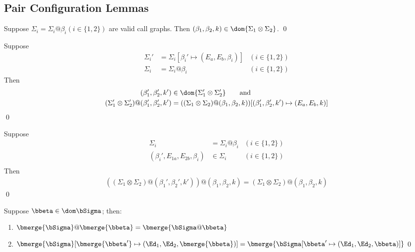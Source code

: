 \subsection{Pair Configuration Lemmas}
\label{sec:pair-lemmas}




\begin{lemma}
  Suppose $\Sigma_i = \Sigma_i@\beta_i (i\in\{1,2\})$ are valid call graphs.
  Then $(\beta_1,\beta_2,k)    \in \dom{\Sigma_1\otimes\Sigma_2}$.
\qed\end{lemma}
\begin{lemma}
  Suppose
  \begin{align*}
    \Sigma_i'              & = \Sigma_i[\beta_i' \mapsto (E_a, E_b, \beta_i)] & (i\in\{1,2\}) \\
    \Sigma_i               & = \Sigma_i@\beta_i                               & (i\in\{1,2\})
  \end{align*}
  Then
  \begin{align*}
    (\beta_1',\beta_2',k')                             & \in \dom{\Sigma_1'\otimes\Sigma_2'} \qquad\text{and}\\
    (\Sigma_1'\otimes\Sigma_2')@(\beta_1',\beta_2',k') & =
    ((\Sigma_1\otimes\Sigma_2)@(\beta_1,\beta_2,k))[(\beta_1',\beta_2',k')\mapsto(E_a,E_b,k)]
  \end{align*}
\qed\end{lemma}
\begin{lemma}
  Suppose
  \begin{align*}
    \Sigma_i                & = \Sigma_i@\beta_i             & (i\in\{1,2\}) \\
    (\beta_i',E_{1a},E_{2b},\beta_i) & \in \Sigma_i          & (i\in\{1,2\}) \\
  \end{align*}
  Then
  \begin{align*}
    ((\Sigma_1\otimes\Sigma_2)@(\beta_1',\beta_2',k'))@(\beta_1,\beta_2,k) =
    (\Sigma_1\otimes\Sigma_2)@(\beta_1,\beta_2,k)
  \end{align*}
\qed\end{lemma}
\begin{lemma}
  Suppose $\bbeta\in\dom\bSigma$; then:
  \begin{enumerate}
    \item $\bmerge{\bSigma}@\bmerge{\bbeta} = \bmerge{\bSigma@\bbeta}$
    \item $\bmerge{\bSigma}[\bmerge{\bbeta'} \mapsto (\Ed_1,\Ed_2,\bmerge{\bbeta})] = \bmerge{\bSigma[\bbeta' \mapsto (\Ed_1,\Ed_2,\bbeta)]}$\qed
  \end{enumerate}
\end{lemma}


